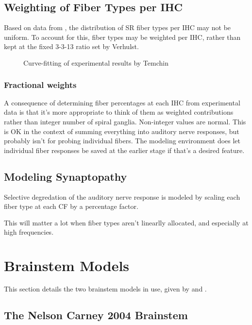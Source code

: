 \subsection{Weighting of Fiber Types per IHC} %
\label{sub:weighting_of_fiber_types_per_ihc}
Based on data from \cite{Temchin2008Threshold}, the distribution of SR fiber types per IHC may not be uniform.  To account for this, fiber types may be weighted per IHC, rather than kept at the fixed 3-3-13 ratio set by Verhulst.  
\begin{figure}[htbp]
	\centering
	\caption{Curve-fitting of experimental results by Temchin}
	\label{fig:temchin-curvefit}
\end{figure}

\subsubsection{Fractional weights}
A consequence of determining fiber percentages at each IHC from experimental data is that it's more appropriate to think of them as weighted contributions rather than integer number of spiral ganglia.  Non-integer values are normal.  This is OK in the context of summing everything into auditory nerve responses, but probably isn't for probing individual fibers.  The modeling environment does let individual fiber responses be saved at the earlier stage if that's a desired feature.

\subsection{Modeling Synaptopathy} %
\label{sub:modeling_synaptopathy}
Selective degredation of the auditory nerve response is modeled by scaling each fiber type at each CF by a percentage factor.  

This will matter a lot when fiber types aren't linearlly allocated, and especially at high frequencies.

\section{Brainstem Models} %
\label{sec:brainstem_models}
This section details the two brainstem models in use, given by \cite{Nelson2004Phenomenological} and \cite{Carney2015Speech}.

\subsection{The Nelson Carney 2004 Brainstem} %
\label{sub:the_nelson_carney_2004_brainstem}

